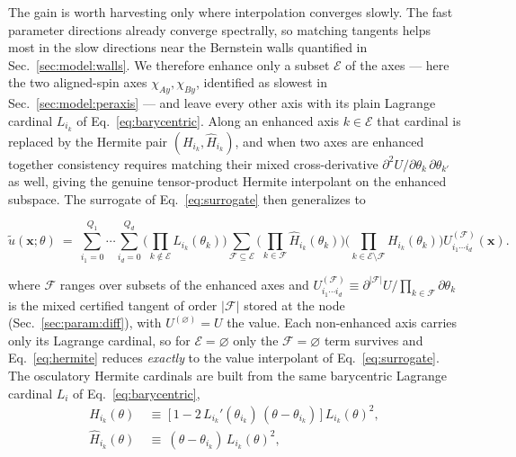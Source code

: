 \documentclass[
  aps,
  prd,
  twocolumn,
  amsmath,
  amssymb,
  nofootinbib,
  superscriptaddress,
  floatfix,
]{revtex4-2}
\begin{document}
The gain is worth harvesting only where interpolation converges slowly. The fast
parameter directions already converge spectrally, so matching tangents helps most in
the slow directions near the Bernstein walls quantified in
Sec.~\ref{sec:model:walls}. We therefore enhance only a subset $\mathcal{E}$ of the
axes --- here the two aligned-spin axes $\chi_{Ay},\chi_{By}$, identified as slowest
in Sec.~\ref{sec:model:peraxis} --- and leave every other axis with its plain
Lagrange cardinal $L_{i_k}$ of Eq.~\eqref{eq:barycentric}. Along an enhanced axis
$k\in\mathcal{E}$ that cardinal is replaced by the Hermite pair
$(H_{i_k},\hat H_{i_k})$, and when two axes are enhanced together consistency
requires matching their mixed cross-derivative
$\partial^2 U/\partial\theta_k\,\partial\theta_{k'}$ as well, giving the genuine
tensor-product Hermite interpolant on the enhanced subspace. The surrogate of
Eq.~\eqref{eq:surrogate} then generalizes to
\begin{widetext}
\begin{equation}
  \tilde u(\mathbf{x};\theta) \ = \ \sum_{i_1=0}^{Q_1}\!\cdots\!\sum_{i_d=0}^{Q_d}
  \Bigg(\prod_{k\notin\mathcal{E}}\! L_{i_k}(\theta_k)\Bigg)
  \sum_{\mathcal{F}\subseteq\mathcal{E}}
  \Bigg(\prod_{k\in\mathcal{F}}\! \hat H_{i_k}(\theta_k)\Bigg)\!
  \Bigg(\prod_{k\in\mathcal{E}\setminus\mathcal{F}}\!\! H_{i_k}(\theta_k)\Bigg)
  U^{(\mathcal{F})}_{i_1\cdots i_d}(\mathbf{x}).
  \label{eq:hermite}
\end{equation}
\end{widetext}
where $\mathcal{F}$ ranges over subsets of the enhanced axes and
$U^{(\mathcal{F})}_{i_1\cdots i_d}\equiv\partial^{|\mathcal{F}|}U/\!\prod_{k\in\mathcal{F}}\partial\theta_k$
is the mixed certified tangent of order $|\mathcal{F}|$ stored at the node
(Sec.~\ref{sec:param:diff}), with $U^{(\varnothing)}=U$ the value. Each non-enhanced
axis carries only its Lagrange cardinal, so for $\mathcal{E}=\varnothing$ only the
$\mathcal{F}=\varnothing$ term survives and Eq.~\eqref{eq:hermite} reduces
\emph{exactly} to the value interpolant of Eq.~\eqref{eq:surrogate}. The osculatory
Hermite cardinals are built from the same barycentric Lagrange cardinal $L_i$ of
Eq.~\eqref{eq:barycentric},
\begin{align}
  H_{i_k}(\theta) \ &\equiv \ \big[\,1 - 2\,L_{i_k}'(\theta_{i_k})\,(\theta-\theta_{i_k})\,\big]\,L_{i_k}(\theta)^2,
  \label{eq:hermite_cardinal_1} \\
  \hat H_{i_k}(\theta) \ &\equiv \ (\theta-\theta_{i_k})\,L_{i_k}(\theta)^2,
  \label{eq:hermite_cardinal_2}
\end{align}
\end{document}
